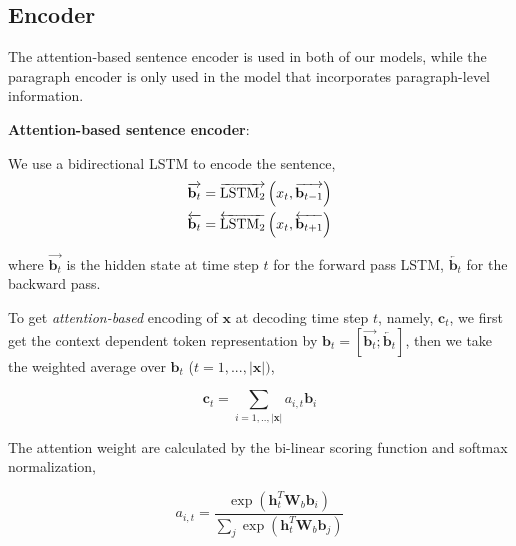 \documentclass[11pt,a4paper]{article}
\begin{document}
\subsection{Encoder}
\label{ssec:encoder}

The attention-based sentence encoder is used in both of our models, while the paragraph encoder is only used in the model that incorporates paragraph-level information.

\vspace{0.3cm}

\noindent \textbf{Attention-based sentence encoder}:

\vspace{0.01cm}

We use a bidirectional LSTM to encode the sentence,
\begin{equation}
\nonumber
\begin{split}
\overrightarrow{\mathbf{b}_t} &= \overrightarrow{{\textnormal{LSTM}_2}} \left( x_{t}, \overrightarrow{\mathbf{b}_{t-1}}\right) \\
\overleftarrow{\mathbf{b}_t} &= \overleftarrow{{\textnormal{LSTM}_2}} \left( x_{t}, \overleftarrow{\mathbf{b}_{t+1}}\right) 
\end{split}
\end{equation}

where $\overrightarrow{\mathbf{b}_t}$ is the hidden state at time step $t$ for the forward pass LSTM, $\overleftarrow{\mathbf{b}_t}$ for the backward pass.


To get \emph{attention-based} encoding of $\mathbf{x}$ at decoding time step $t$, namely, $\mathbf{c}_t$, we first get the context dependent token representation by $\mathbf{b}_t = [\overrightarrow{\mathbf{b}_t}; \overleftarrow{\mathbf{b}_t} ]$, then we take the weighted average over $\mathbf{b}_t$ ($t = 1, ..., |\mathbf{x}|)$,

\begin{equation}
\mathbf{c}_t = \sum_{i=1,..,|\mathbf{x}|} a_{i,t} \mathbf{b}_i
\end{equation}

The attention weight are calculated by the bi-linear scoring function and softmax normalization,

\begin{equation}
a_{i,t} = \frac{\exp \left( \mathbf{h}_t^{T} \mathbf{W}_b \mathbf{b}_i\right)}{\sum_{j} \exp \left( \mathbf{h}_t^{T} \mathbf{W}_b \mathbf{b}_j\right)}  
\end{equation}
\end{document}
